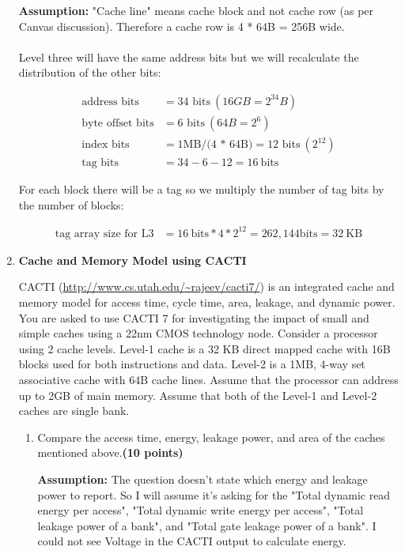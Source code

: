 \documentclass[a4paper, 11pt]{exam}
\begin{document}
\begin{enumerate}
\textbf{Assumption:} "Cache line" means cache block and not cache row (as per Canvas discussion). Therefore a cache row is 4 * 64B = 256B wide.\\ \\

Level three will have the same address bits but we will recalculate the distribution of the other bits:

\begin{align*}
\text{address bits} &= \text{34 bits} \  (16GB = 2^{34} B) \\
\text{byte offset bits} &= \text{6 bits} \ (64B = 2^6) \\
\text{index bits} &= \text{1MB/(4 * 64B)} = \text{12 bits} \ (2^{12})\\
\text{tag bits} &= 34 - 6 - 12 =  16 \ \text{bits}         
\end{align*}

For each block there will be a tag so we multiply the number of tag bits by the number of blocks:

\begin{align*}
\text{tag array size for L3} &= 16 \ \text{bits} * 4 * 2^{12} = 262,144 \text{bits} = 32 \ \text{KB} 	
\end{align*}


\item \textbf{Cache and Memory Model using CACTI }

CACTI (\url{http://www.cs.utah.edu/~rajeev/cacti7/}) is an integrated cache and memory model for access time, cycle time, area, leakage, and dynamic power. You are asked to use CACTI 7 for investigating the impact of small and simple caches using a 22nm CMOS technology node. Consider a processor using 2 cache levels. Level-1 cache is a 32 KB direct mapped cache with 16B blocks used for both instructions and data. Level-2 is a 1MB, 4-way set associative cache with 64B cache lines. Assume that the processor can address up to 2GB of main memory. Assume that both of the Level-1 and Level-2 caches are single bank.
\begin{enumerate}
	\item Compare the access time, energy, leakage power, and area of the caches mentioned above.\textbf{(10 points)} 
	
	\textbf{Assumption:} The question doesn't state which energy and leakage power to report. So I will assume it's asking for the "Total dynamic read energy per access", "Total dynamic write energy per access", "Total leakage power of a bank", and "Total gate leakage power of a bank". I could not see Voltage in the CACTI output to calculate energy.


\end{enumerate}
\end{enumerate}
\end{document}
